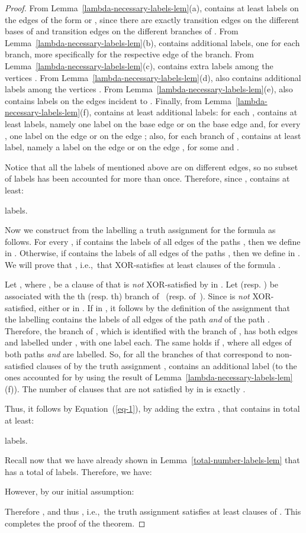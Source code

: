 \documentclass[a4paper,UKenglish]{article}
\begin{document}
\begin{proof}
From Lemma~\ref{lambda-necessary-labels-lem}(a),  contains at least  labels on the edges of the form  or , since there are exactly  transition edges on the different bases of  and  transition edges on the different branches of . From Lemma~\ref{lambda-necessary-labels-lem}(b),  contains  additional labels, one for each branch, more specifically for the respective edge  of the branch. From Lemma~\ref{lambda-necessary-labels-lem}(c),  contains  extra labels among the vertices .
From Lemma~\ref{lambda-necessary-labels-lem}(d),  also contains  additional labels among the vertices . From Lemma~\ref{lambda-necessary-labels-lem}(e),  also contains  labels on the edges incident to . Finally, from Lemma~\ref{lambda-necessary-labels-lem}(f),  contains at least  additional labels: for each ,  contains at least  labels, namely one label on the base edge  or on the base edge  and, for every , one label on the edge  or on the edge ; also, for each branch of ,  contains at least  label, namely a label on the edge  or on the edge , for some  and .

Notice that all the labels of  mentioned above are on different edges, so no subset of labels has been accounted for more than once. Therefore, since ,  contains at least:

labels.

Now we construct from the labelling  a
truth assignment  for the formula  as follows. For every , if  contains the labels of all edges of the
paths , then we define  in .
Otherwise, if  contains the labels of all edges of the paths , then we define  in . We will prove
that , i.e.,~that  XOR-satisfies at least 
clauses of the formula .

Let , where , be a clause of  that is \emph{not} XOR-satisfied by  in .  Let  (resp. ) be associated with the th (resp. th) branch of~ (resp. of~).
Since  is \emph{not} XOR-satisfied,
either  or  in . If  in , it follows by the definition of
the assignment  that the labelling  contains the labels of
all edges of the path  \emph{and} of the path . Therefore, the  branch of , which is identified with the  branch of , has both edges  and  labelled under , with one label each. The same holds if , where all edges of both paths  \emph{and}  are labelled. So, for all the branches of  that correspond to non-satisfied clauses of  by the truth assignment ,  contains an additional label (to the ones accounted for by using the result of Lemma~\ref{lambda-necessary-labels-lem}(f)). The number of clauses that are not satisfied by  in  is exactly .

Thus, it follows by Equation~(\ref{eq-1}), by adding the extra , that  contains in total at least:

labels.

Recall now that we have already shown in Lemma~\ref{total-number-labels-lem} that  has a total of  labels. Therefore, we have:


However, by our initial assumption:


Therefore , and thus , i.e.,~the truth
assignment  satisfies at least  clauses of . This completes
the proof of the theorem.
\end{proof}
\end{document}
